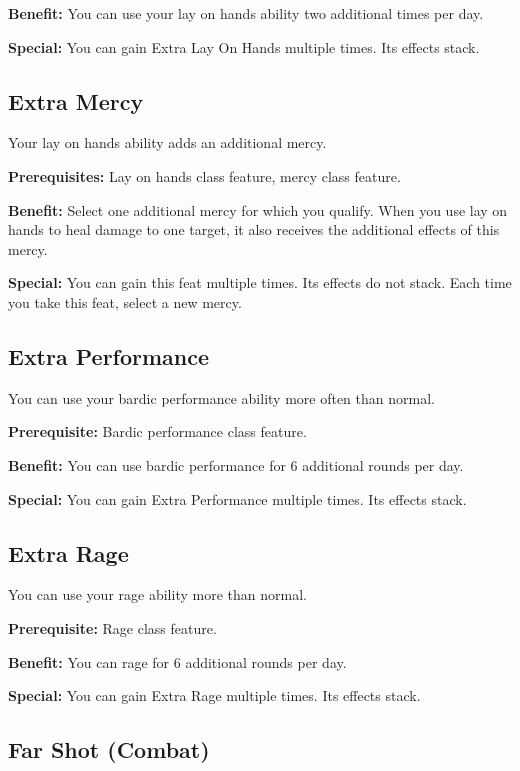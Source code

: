 \textbf{Benefit:} You can use your lay on hands ability two additional times per day. 
				
\textbf{Special:} You can gain Extra Lay On Hands multiple times. Its effects stack.
				
\subsection{Extra Mercy}

				
Your lay on hands ability adds an additional mercy.
				
\textbf{Prerequisites:} Lay on hands class feature, mercy class feature.
				
\textbf{Benefit:} Select one additional mercy for which you qualify. When you use lay on hands to heal damage to one target, it also receives the additional effects of this mercy.
				
\textbf{Special:} You can gain this feat multiple times. Its effects do not stack. Each time you take this feat, select a new mercy. 
				
\subsection{Extra Performance}

				
You can use your bardic performance ability more often than normal.
				
\textbf{Prerequisite:} Bardic performance class feature.
				
\textbf{Benefit:} You can use bardic performance for 6 additional rounds per day.
				
\textbf{Special:} You can gain Extra Performance multiple times. Its effects stack.
				
\subsection{Extra Rage}

				
You can use your rage ability more than normal.
				
\textbf{Prerequisite:} Rage class feature.
				
\textbf{Benefit:} You can rage for 6 additional rounds per day.
				
\textbf{Special:} You can gain Extra Rage multiple times. Its effects stack.
				
\subsection{Far Shot (Combat)}

